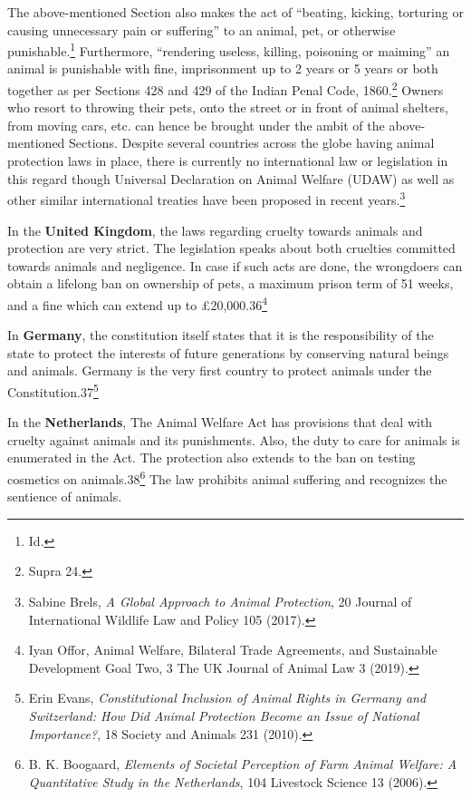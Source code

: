 \begin{multicols}{2}
\noi
The above-mentioned Section also makes the act of “beating, kicking, torturing or causing
unnecessary pain or suffering” to an animal, pet, or otherwise punishable.\footnote{Id.} Furthermore,
“rendering useless, killing, poisoning or maiming” an animal is punishable with fine,
imprisonment up to 2 years or 5 years or both together as per Sections 428 and 429 of the
Indian Penal Code, 1860.\footnote{Supra 24.} Owners who resort to throwing their pets, onto the street or in
front of animal shelters, from moving cars, etc. can hence be brought under the ambit of the
above-mentioned Sections. Despite several countries across the globe having animal
protection laws in place, there is currently no international law or legislation in this regard
though Universal Declaration on Animal Welfare (UDAW) as well as other similar
international treaties have been proposed in recent years.\footnote{Sabine Brels, \textit{A Global Approach to Animal Protection}, 20 Journal of International Wildlife Law and Policy 105 (2017).}


\noi
In the {\bf United Kingdom}, the laws regarding cruelty towards animals and protection are very
strict. The legislation speaks about both cruelties committed towards animals and negligence.
In case if such acts are done, the wrongdoers can obtain a lifelong ban on ownership of pets, a
maximum prison term of 51 weeks, and a fine which can extend up to £20,000.36\footnote{Iyan Offor, Animal Welfare, Bilateral Trade Agreements, and Sustainable Development Goal Two, 3 The UK Journal of Animal Law 3 (2019).}

\noi
In {\bf Germany}, the constitution itself states that it is the responsibility of the state to protect the
interests of future generations by conserving natural beings and animals. Germany is the very
first country to protect animals under the Constitution.37\footnote{Erin Evans, \textit{Constitutional Inclusion of Animal Rights in Germany and Switzerland: How Did Animal Protection Become an Issue of National Importance?}, 18 Society and Animals 231 (2010). }

\noi
In the {\bf Netherlands}, The Animal Welfare Act has provisions that deal with cruelty against
animals and its punishments. Also, the duty to care for animals is enumerated in the Act. The
protection also extends to the ban on testing cosmetics on animals.38\footnote{B. K. Boogaard, \textit{Elements of Societal Perception of Farm Animal Welfare: A Quantitative Study in the Netherlands}, 104 Livestock Science 13 (2006).} The law prohibits animal
suffering and recognizes the sentience of animals. 



\end{multicols}

